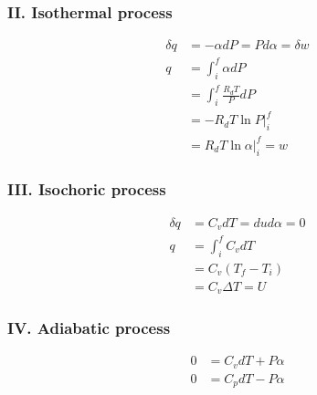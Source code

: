 \documentclass[fleqn,10pt]{SelfArx} %
\begin{document}
\subsubsection*{II. Isothermal process}
\begin{align}
    \delta q &= -\alpha dP = Pd\alpha = \delta w \\
    q &= \int^f_i \alpha dP \\
      &= \int^f_i \frac{R_d T}{P} dP \\
      &= -R_d T \ln P|^f_i \\
      &= R_d T \ln \alpha|^f_i = w
\end{align}

\subsubsection*{III. Isochoric process}
\begin{align}
    \delta q &= C_v dT =du  d\alpha = 0 \\
    q &= \int^f_i C_v dT \\
      &= C_v (T_f -T_i) \\
      &= C_v \Delta T = U
\end{align}

\subsubsection*{IV. Adiabatic process}
\begin{align}
    0 &= C_v dT + P\alpha \\
    0 &= C_p dT - P\alpha
\end{align}
\end{document}
